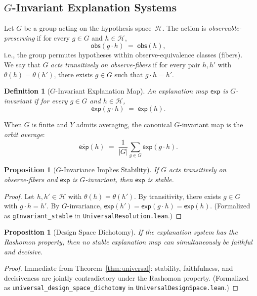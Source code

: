 \documentclass[11pt,a4paper]{article}
\newtheorem{definition}[theorem]{Definition}
\newtheorem{proposition}[theorem]{Proposition}
\newcommand{\sH}{\mathcal{H}}
\begin{document}
\subsection[G-Invariant Explanation Systems]{$G$-Invariant Explanation Systems}
\label{sec:g-invariant}

Let $G$ be a group acting on the hypothesis space~$\sH$.  The action is
\emph{observable-preserving} if for every $g \in G$ and $h \in \sH$,
\[
  \mathsf{obs}(g \cdot h) \;=\; \mathsf{obs}(h),
\]
i.e., the group permutes hypotheses within observe-equivalence classes
(fibers).  We say that $G$ \emph{acts transitively on observe-fibers} if for
every pair $h, h'$ with $\theta(h) = \theta(h')$, there exists $g \in G$
such that $g \cdot h = h'$.

\begin{definition}[$G$-Invariant Explanation Map]
\label{def:g-invariant}
An explanation map $\mathsf{exp}$ is \emph{$G$-invariant} if for every
$g \in G$ and $h \in \sH$,
\[
  \mathsf{exp}(g \cdot h) \;=\; \mathsf{exp}(h).
\]
\end{definition}

When $G$ is finite and $Y$ admits averaging, the canonical $G$-invariant map
is the \emph{orbit average}:
\[
  \overline{\mathsf{exp}}(h) \;=\; \frac{1}{|G|}\sum_{g \in G} \mathsf{exp}(g \cdot h).
\]

\begin{proposition}[$G$-Invariance Implies Stability]
\label{prop:g-invariant-stable}
If $G$ acts transitively on observe-fibers and $\mathsf{exp}$ is
$G$-invariant, then $\mathsf{exp}$ is stable.
\end{proposition}

\begin{proof}
Let $h, h' \in \sH$ with $\theta(h) = \theta(h')$.  By transitivity, there
exists $g \in G$ with $g \cdot h = h'$.  By $G$-invariance,
$\mathsf{exp}(h') = \mathsf{exp}(g \cdot h) = \mathsf{exp}(h)$.
(Formalized as \texttt{gInvariant\_stable} in
\texttt{UniversalResolution.lean}.)
\end{proof}

\begin{proposition}[Design Space Dichotomy]
\label{prop:dichotomy}
If the explanation system has the Rashomon property, then no stable
explanation map can simultaneously be faithful and decisive.
\end{proposition}

\begin{proof}
Immediate from Theorem~\ref{thm:universal}: stability, faithfulness, and
decisiveness are jointly contradictory under the Rashomon property.
(Formalized as \texttt{universal\_design\_space\_dichotomy} in
\texttt{UniversalDesignSpace.lean}.)
\end{proof}
\end{document}
